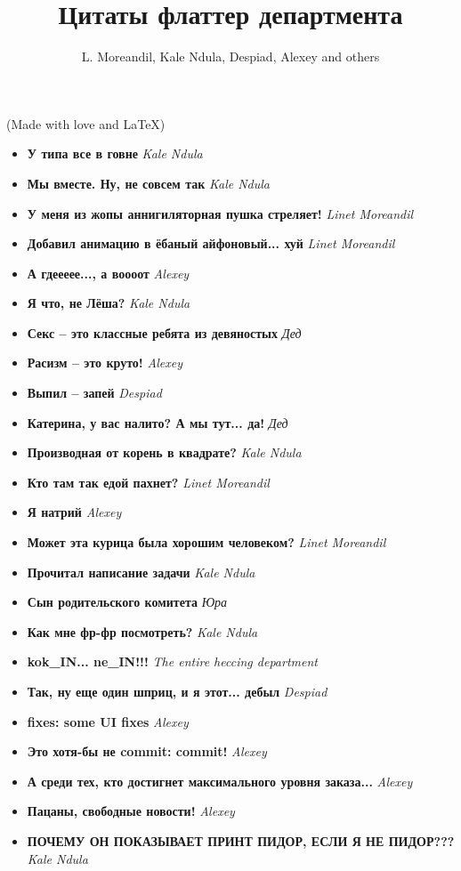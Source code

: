 \documentclass[12pt,a4paper]{article}
\title{Цитаты флаттер департмента}
\author{L. Moreandil, Kale Ndula, Despiad, Alexey and others}
\newcommand{\entry}[2] {\textbf{#1} \textemdash \emph{#2}}
\newcommand{\kn}{Kale Ndula}
\newcommand{\lm}{Linet Moreandil}
\newcommand{\dd}{Despiad}
\newcommand{\al}{Alexey}
\begin{document}
\maketitle
\begin{center}
(Made with love and \LaTeX)
\end{center}

\begin{itemize}

\item \entry{У типа все в говне}{\kn}
\item \entry{Мы вместе. Ну, не совсем так}{\kn}
\item \entry{У меня из жопы аннигиляторная пушка стреляет!}{\lm}
\item \entry{Добавил анимацию в ёбаный айфоновый... хуй}{\lm}
\item \entry{А гдеееее..., а воооот}{\al}
\item \entry{Я что, не Лёша?}{\kn}
\item \entry{Секс -- это классные ребята из девяностых}{Дед}
\item \entry{Расизм -- это круто!}{\al}
\item \entry{Выпил -- запей}{\dd}
\item \entry{Катерина, у вас налито? А мы тут... да!}{Дед}
\item \entry{Производная от корень в квадрате?}{\kn}
\item \entry{Кто там так едой пахнет?}{\lm}
\item \entry{Я натрий}{\al}
\item \entry{Может эта курица была хорошим человеком?}{\lm}
\item \entry{Прочитал написание задачи}{\kn}
\item \entry{Сын родительского комитета}{Юра}
\item \entry{Как мне фр-фр посмотреть?}{\kn}
\item \entry{kok\_IN... ne\_IN!!!}{The entire heccing department}
\item \entry{Так, ну еще один шприц, и я этот... дебыл}{\dd}
\item \entry{fixes: some UI fixes}{\al}
\item \entry{Это хотя-бы не commit: commit!}{\al}
\item \entry{А среди тех, кто достигнет максимального уровня заказа...}{\al}
\item \entry{Пацаны, свободные новости!}{\al}
\item \entry{ПОЧЕМУ ОН ПОКАЗЫВАЕТ ПРИНТ ПИДОР, ЕСЛИ Я НЕ ПИДОР???}{\kn}

\end{itemize}
\end{document}
